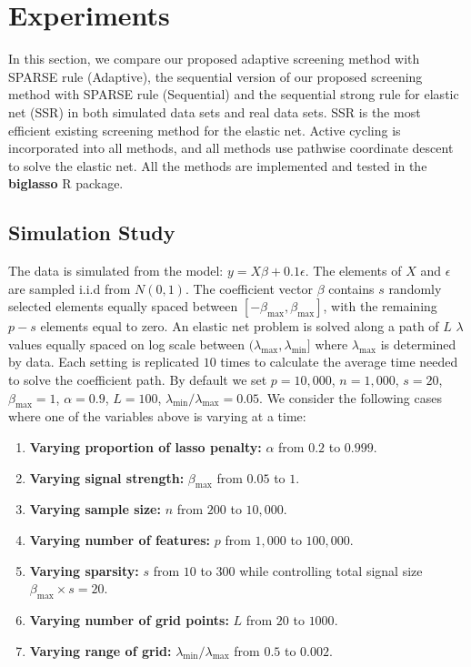 \section{Experiments}

In this section, we compare our proposed adaptive screening method with SPARSE rule (Adaptive), the sequential version of our proposed screening method with SPARSE rule (Sequential) and the sequential strong rule for elastic net (SSR) in both simulated data sets and real data sets. SSR is the most efficient existing screening method for the elastic net. Active cycling is incorporated into all methods, and all methods use pathwise coordinate descent to solve the elastic net. All the methods are implemented and tested in the \textbf{biglasso} R package.

\subsection{Simulation Study}

The data is simulated from the model: $y=X\beta+0.1\epsilon$. The elements of $X$ and $\epsilon$ are sampled i.i.d from $N(0,1)$. The coefficient vector $\beta$ contains $s$ randomly selected elements equally spaced between $[-\beta_{\max},\beta_{\max}]$, with the remaining $p-s$ elements equal to zero. An elastic net problem is solved along a path of $L$ $\lambda$ values equally spaced on log scale between $(\lambda_{\max},\lambda_{\min}]$ where $\lambda_{\max}$ is determined by data. Each setting is replicated $10$ times to calculate the average time needed to solve the coefficient path. By default we set $p=10,000$, $n=1,000$, $s=20$, $\beta_{\max}=1$, $\alpha=0.9$, $L=100$, $\lambda_{\min}/\lambda_{\max}=0.05$. We consider the following cases where one of the variables above is varying at a time:

\begin{enumerate}
    \item \textbf{Varying proportion of lasso penalty:} $\alpha$ from $0.2$ to $0.999$.
    \item \textbf{Varying signal strength:} $\beta_{\max}$ from $0.05$ to $1$.
    \item \textbf{Varying sample size:} $n$ from $200$ to $10,000$.
    \item \textbf{Varying number of features:} $p$ from $1,000$ to $100,000$.
    \item \textbf{Varying sparsity:} $s$ from $10$ to $300$ while controlling total signal size $\beta_{\max}\times s=20$.
    \item \textbf{Varying number of grid points:}  $L$ from $20$ to $1000$.
    \item \textbf{Varying range of grid:}  $\lambda_{\min}/\lambda_{\max}$ from $0.5$ to $0.002$.
\end{enumerate}

